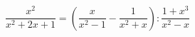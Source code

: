 \begin{ex}[type=equation]
	\begin{condition}
		$\dfrac{x^2}{x^2 + 2x  + 1} = \left(\dfrac{x}{x^2  - 1} - \dfrac{1}{x^2 + x}\right) : \dfrac{1 + x^3}{x^2 - x}$
	\end{condition}
	\answer{$\varnothing$}
\end{ex}